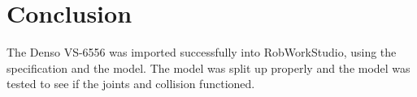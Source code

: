 \section{Conclusion}
\label{sec:conclusion}

The Denso VS-6556 was imported successfully into RobWorkStudio, using the specification and the model. The model was split up properly and the model was tested to see if the joints and collision functioned. 